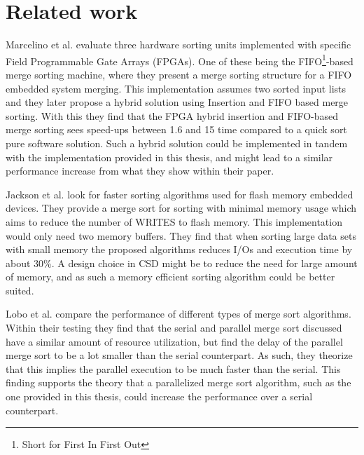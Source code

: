 
\section{Related work}
Marcelino et al. \cite{sorting_units} evaluate three hardware sorting units
implemented with specific Field Programmable Gate Arrays (FPGAs). One of these
being the FIFO\footnote{Short for First In First Out}-based merge sorting
machine, where they present a merge sorting structure for a FIFO embedded system
merging. This implementation assumes two sorted input lists and they later
propose a hybrid solution using Insertion and FIFO based merge sorting. With
this they find that the FPGA hybrid insertion and FIFO-based merge sorting sees
speed-ups between 1.6 and 15 time compared to a quick sort pure software
solution. Such a hybrid solution could be implemented in tandem with the
implementation provided in this thesis, and might lead to a similar performance
increase from what they show within their paper.

Jackson et al. \cite{flash_sorting} look for faster sorting algorithms used for
flash memory embedded devices. They provide a merge sort for sorting with
minimal memory usage which aims to reduce the number of WRITES to flash memory.
This implementation would only need two memory buffers. They find that when
sorting large data sets with small memory the proposed algorithms reduces I/Os
and execution time by about 30\%. A design choice in CSD might be to reduce the
need for large amount of memory, and as such a memory efficient sorting
algorithm could be better suited.

Lobo et al. \cite{merge_sort} compare the performance of different types of
merge sort algorithms. Within their testing they find that the serial and
parallel merge sort discussed have a similar amount of resource
utilization, but find the delay of the parallel merge sort to be a lot smaller
than the serial counterpart. As such, they theorize that this implies the
parallel execution to be much faster than the serial. This finding supports the
theory that a parallelized merge sort algorithm, such as the one provided in
this thesis, could increase the performance over a serial counterpart.
